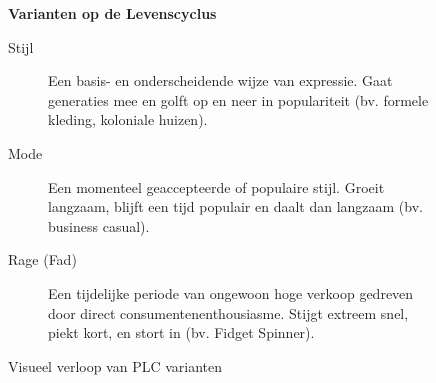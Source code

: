 \documentclass[a4paper,11pt]{article}
\begin{document}
\begin{figure}[ht]
    \centering
    \begin{minipage}{0.45\textwidth}
        \textbf{Varianten op de Levenscyclus}
        \begin{description}
            \item[\textcolor{schoolBlue}{Stijl}] Een basis- en onderscheidende wijze van expressie. Gaat generaties mee en golft op en neer in populariteit (bv. formele kleding, koloniale huizen).
            \item[\textcolor{schoolOrange}{Mode}] Een momenteel geaccepteerde of populaire stijl. Groeit langzaam, blijft een tijd populair en daalt dan langzaam (bv. business casual).
            \item[\textcolor{schoolRed}{Rage (Fad)}] Een tijdelijke periode van ongewoon hoge verkoop gedreven door direct consumentenenthousiasme. Stijgt extreem snel, piekt kort, en stort in (bv. Fidget Spinner).
        \end{description}
    \end{minipage}%
    \hfill
    \begin{minipage}{0.5\textwidth}
        \centering
        \caption{Visueel verloop van PLC varianten}
        \label{fig:plc_types}
    \end{minipage}
\end{figure}
\end{document}
